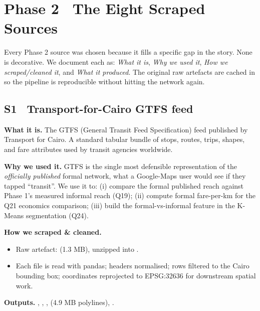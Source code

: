 
\section{Phase 2 \textbullet\ The Eight Scraped Sources}
\label{sec:phase2-sources}

Every Phase 2 source was chosen because it fills a specific gap in the
story. None is decorative. We document each as: \emph{What it is},
\emph{Why we used it}, \emph{How we scraped/cleaned it}, and
\emph{What it produced}. The original raw artefacts are cached in
 so the pipeline is reproducible without hitting
the network again.

\subsection{S1 \textbullet\ Transport-for-Cairo GTFS feed}

\textbf{What it is.} The GTFS (General Transit Feed Specification) feed
published by Transport for Cairo. A standard tabular bundle of stops,
routes, trips, shapes, and fare attributes used by transit agencies
worldwide.

\textbf{Why we used it.} GTFS is the single most defensible
representation of the \emph{officially published} formal network, what
a Google-Maps user would see if they tapped ``transit''. We use it to:
(i) compare the formal published reach against Phase 1's measured
informal reach (Q19); (ii) compute formal fare-per-km for the
Q21 economics comparison; (iii) build the formal-vs-informal feature
in the K-Means segmentation (Q24).

\textbf{How we scraped \& cleaned.}
\begin{itemize}
 \item Raw artefact:  (1.3 MB),
 unzipped into .
 \item Each  file is read with pandas; headers normalised;
 rows filtered to the Cairo bounding box; coordinates reprojected
 to EPSG:32636 for downstream spatial work.
\end{itemize}

\textbf{Outputs.} , ,
,  (4.9 MB polylines),
.

